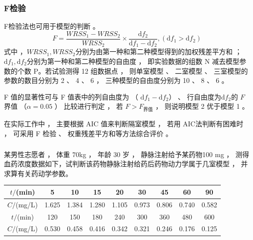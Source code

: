 \documentclass[dvipsnames, svgnames, x11names]{beamer}
\begin{document}
\begin{frame}
    \frametitle{F检验}
    F检验法也可用于模型的判断 。
    \[
        F=\frac{WRSS_{1}-WRSS_{2}}{WRSS_{2}}\times\frac{\mathrm{d}f_{2}}{\mathrm{d}f_{1}-\mathrm{d}f_{2}},(\mathrm{d}f_{1}>\mathrm{d}f_{2})
    \]
    式中 ，$WRSS_{1}, WRSS_{2}$分别为由第一种和第二种模型得到的加权残差平方和 ； $\mathrm{d}f_{1}, \mathrm{d}f_{2}$分别为第一种和第二种模型的自由度 ， 即实验数据的组数 N 减去模型参数的个数 P。若试验测得 12 组数据点 ， 则单室模型 、 二室模型 、 三室模型的参数的数目分别为 2 、 4 、 6 ， 三种模型的自由度分别为 10 、 8 、 6 。

    F 值的显著性可与 F 值表中的列自由度为 （ $\mathrm{d}f_{1}-\mathrm{d}f_{2}$） 、 行自由度为$\mathrm{d}f_{2}$的 $F$ 界值 （$\alpha = 0.05$ ） 比较进行判定 ， 若 $F>F_\text{界值}$ ， 则说明模型 2 优于模型 1 。

    在实际工作中 ， 主要根据 AIC 值来判断隔室模型 ， 若用 AIC法判断有困难时 ， 可采用 F 检验 、 权重残差平方和等方法综合评价 。
\end{frame}


\begin{frame}[t]
    \frametitle{}
    \begin{example}
        某男性志愿者 ， 体重 70kg ， 年龄 30 岁 ， 静脉注射给予某药物100 mg ， 测得血药浓度数据如下，试判断该药物静脉注射给药后药物动力学属于几室模型 ， 并求算有关药动学参数。
        \begin{table}
            \centering
            \begin{tabular}{ccccccccc}
                \bottomrule
                $t/$(min) & 5 & 10 &  15 & 20 & 30 & 45  & 60 & 90 \\ \hline
                $C/$(mg/L) & 1.625 & 1.384 & 1.280 & 1.105 & 0.973 & 0.806 & 0.740 & 0.582 \\ \hline \hline
                $t/$(min) & 120 & 150 & 180  & 240 & 300 & 360 & 480 & 600 \\ \hline
                $C/$(mg/L) & 0.530 & 0.458 & 0.416 & 0.342 & 0.321 & 0.246 & 0.176 & 0.125 \\ \toprule
            \end{tabular}
        \end{table}
    \end{example}
\end{frame}
\end{document}
